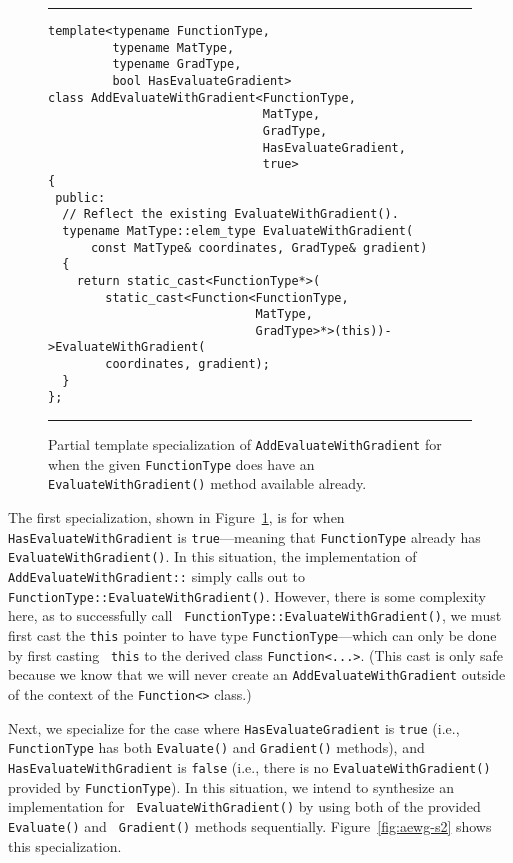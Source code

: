 \begin{figure}[b!]
\hrule
\vspace{1ex}
\begin{verbatim}
template<typename FunctionType,
         typename MatType,
         typename GradType,
         bool HasEvaluateGradient>
class AddEvaluateWithGradient<FunctionType,
                              MatType,
                              GradType,
                              HasEvaluateGradient,
                              true>
{
 public:
  // Reflect the existing EvaluateWithGradient().
  typename MatType::elem_type EvaluateWithGradient(
      const MatType& coordinates, GradType& gradient)
  {
    return static_cast<FunctionType*>(
        static_cast<Function<FunctionType,
                             MatType,
                             GradType>*>(this))->EvaluateWithGradient(
        coordinates, gradient);
  }
};
\end{verbatim}
\hrule
\vspace*{-0.5em}
\caption{Partial template specialization of {\tt AddEvaluateWithGradient} for
when the given {\tt FunctionType} does have an {\tt EvaluateWithGradient()}
method available already.}
\label{fig:aewg-s1}
\end{figure}

The first specialization, shown in Figure~\ref{fig:aewg-s1}, is for when {\tt
HasEvaluateWithGradient} is {\tt true}---meaning that {\tt FunctionType} already
has {\tt EvaluateWithGradient()}.  In this situation, the implementation of {\tt
AddEvaluateWithGradient::} simply calls
out to {\tt FunctionType::EvaluateWithGradient()}.  However, there is some
complexity here, as to successfully call {\tt
FunctionType::EvaluateWithGradient()}, we must first cast the {\tt this} pointer
to have type {\tt FunctionType}---which can only be done by first casting {\tt
this} to the derived class {\tt Function<...>}.  (This cast is only safe because
we know that we will never create an {\tt AddEvaluateWithGradient} outside of
the context of the {\tt Function<>} class.)

Next, we specialize for the case where {\tt HasEvaluateGradient} is {\tt true}
(i.e., {\tt FunctionType} has both {\tt Evaluate()} and {\tt Gradient()}
methods), and {\tt HasEvaluateWithGradient} is {\tt false} (i.e., there is no
{\tt EvaluateWithGradient()} provided by {\tt FunctionType}).  In this
situation, we intend to synthesize an implementation for {\tt
EvaluateWithGradient()} by using both of the provided {\tt Evaluate()} and {\tt
Gradient()} methods sequentially.  Figure~\ref{fig:aewg-s2} shows this
specialization.

